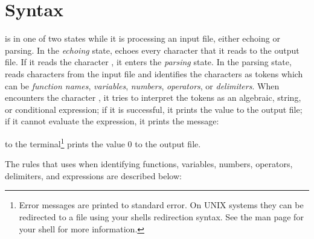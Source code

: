 \chapter{Syntax}\label{ch:syntax}

\aprepro{} is in one of two states while it is processing an input file,
either echoing or parsing. In the \textit{echoing} state, \aprepro{}
echoes every character that it reads to the output file. If it reads
the character \cmd{\{}, it enters the \textit{parsing} state. In
the parsing state, \aprepro{} reads characters from the input file
and identifies the characters as tokens which can be \textit{function
names}, \textit{variables}, \textit{numbers}, \textit{operators}, or
\textit{delimiters}.  When \aprepro{} encounters the character
\cmd{\}}, it tries to interpret the tokens as an algebraic, string,
or conditional expression; if it is successful, it prints the value
to the output file; if it cannot evaluate the expression, it prints
the message:


to the terminal\footnote{Error messages are printed to standard
error. On UNIX systems they can be redirected to a file using your
shells redirection syntax. See the man page for your shell for more
information.} prints the value 0 to the output file.

The rules that \aprepro{} uses when identifying functions, variables, numbers,
operators, delimiters, and expressions are described below:

